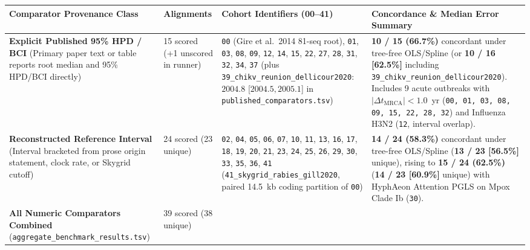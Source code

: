 \documentclass[11pt,letterpaper]{article}
\begin{document}
\clearpage

\begin{table}[!htbp]
\centering
\scriptsize
\renewcommand{\arraystretch}{1.05}
\begin{tabularx}{\textwidth}{p{3.1cm}p{1.7cm}p{4.2cm}X}
\toprule
\textbf{Comparator Provenance Class} & \textbf{Alignments} & \textbf{Cohort Identifiers (00--41)} & \textbf{Concordance \& Median Error Summary} \\
\midrule
\textbf{Explicit Published 95\% HPD / BCI} \newline (Primary paper text or table reports root median and 95\% HPD/BCI directly) & 15 scored \newline (+1 unscored in runner) &
\texttt{00} (Gire et al.\ 2014 81-seq root), \texttt{01}, \texttt{03}, \texttt{08}, \texttt{09}, \texttt{12}, \texttt{14}, \texttt{15}, \texttt{22}, \texttt{27}, \texttt{28}, \texttt{31}, \texttt{32}, \texttt{34}, \texttt{37} \newline (plus \nolinkurl{39_chikv_reunion_dellicour2020}: $2004.8$ [$2004.5, 2005.1$] in \nolinkurl{published_comparators.tsv}) &
\textbf{10 / 15 (66.7\%)} concordant under tree-free OLS/Spline (or \textbf{10 / 16 [62.5\%]} including \nolinkurl{39_chikv_reunion_dellicour2020}). Includes 9 acute outbreaks with $|\Delta t_{\mathrm{MRCA}}| < 1.0$~yr (\texttt{00, 01, 03, 08, 09, 15, 22, 28, 32}) and Influenza H3N2 (\texttt{12}, interval overlap). \\
\addlinespace
\textbf{Reconstructed Reference Interval} \newline (Interval bracketed from prose origin statement, clock rate, or Skygrid cutoff) & 24 scored \newline (23 unique) &
\texttt{02}, \texttt{04}, \texttt{05}, \texttt{06}, \texttt{07}, \texttt{10}, \texttt{11}, \texttt{13}, \texttt{16}, \texttt{17}, \texttt{18}, \texttt{19}, \texttt{20}, \texttt{21}, \texttt{23}, \texttt{24}, \texttt{25}, \texttt{26}, \texttt{29}, \texttt{30}, \texttt{33}, \texttt{35}, \texttt{36}, \texttt{41} (\nolinkurl{41_skygrid_rabies_gill2020}, paired 14.5~kb coding partition of \texttt{00}) &
\textbf{14 / 24 (58.3\%)} concordant under tree-free OLS/Spline (\textbf{13 / 23 [56.5\%]} unique), rising to \textbf{15 / 24 (62.5\%)} (\textbf{14 / 23 [60.9\%]} unique) with HyphAeon Attention PGLS on Mpox Clade Ib (\texttt{30}). \\
\addlinespace
\textbf{All Numeric Comparators Combined} \newline (\nolinkurl{aggregate_benchmark_results.tsv}) & 39 scored \newline (38 unique) &

\end{tabularx}
\end{table}
\end{document}
